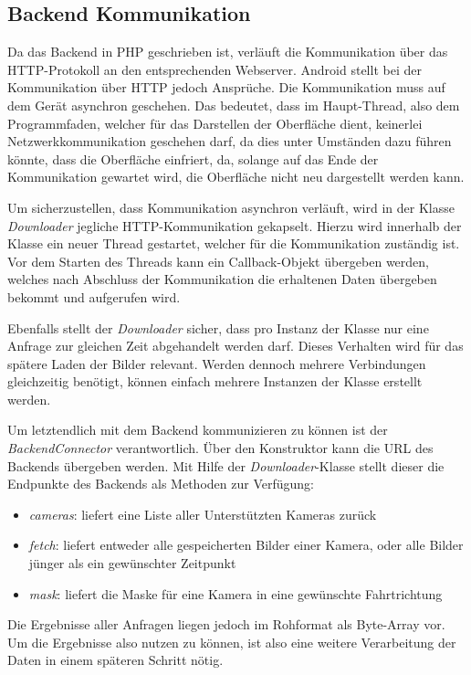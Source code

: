 \subsection{Backend Kommunikation}
\label{sec:BackendCom}
Da das Backend in PHP geschrieben ist, verläuft die Kommunikation über das HTTP-Protokoll an den entsprechenden Webserver.
Android stellt bei der Kommunikation über HTTP jedoch Ansprüche. Die Kommunikation muss auf dem Gerät asynchron geschehen. Das bedeutet, dass im Haupt-Thread,
also dem Programmfaden, welcher für das Darstellen der Oberfläche dient, keinerlei Netzwerkkommunikation geschehen darf, da dies unter Umständen dazu führen könnte, dass die Oberfläche einfriert, da, solange auf das Ende der Kommunikation gewartet wird, die Oberfläche nicht neu dargestellt werden kann.

Um sicherzustellen, dass Kommunikation asynchron verläuft, wird in der Klasse {\em Downloader} jegliche HTTP-Kommunikation gekapselt.
Hierzu wird innerhalb der Klasse ein neuer Thread gestartet, welcher für die Kommunikation zuständig ist. Vor dem Starten des Threads kann ein Callback-Objekt übergeben werden, welches nach Abschluss der Kommunikation die erhaltenen Daten übergeben bekommt und aufgerufen wird.

Ebenfalls stellt der {\em Downloader} sicher, dass pro Instanz der Klasse nur eine Anfrage zur gleichen Zeit abgehandelt werden darf. Dieses Verhalten wird für das spätere Laden der Bilder relevant.
Werden dennoch mehrere Verbindungen gleichzeitig benötigt, können einfach mehrere Instanzen der Klasse erstellt werden.

Um letztendlich mit dem Backend kommunizieren zu können ist der {\em BackendConnector} verantwortlich.
Über den Konstruktor kann die URL des Backends übergeben werden.
Mit Hilfe der {\em Downloader}-Klasse stellt dieser die Endpunkte des Backends als Methoden zur Verfügung:

\begin{itemize}
\item{{\em cameras}: liefert eine Liste aller Unterstützten Kameras zurück}
\item{{\em fetch}: liefert entweder alle gespeicherten Bilder einer Kamera, oder alle Bilder jünger als ein gewünschter Zeitpunkt}
\item{{\em mask}: liefert die Maske für eine Kamera in eine gewünschte Fahrtrichtung}
\end{itemize}

Die Ergebnisse aller Anfragen liegen jedoch im Rohformat als Byte-Array vor. Um die Ergebnisse also nutzen zu können, ist also eine weitere Verarbeitung der Daten in einem späteren Schritt nötig.

